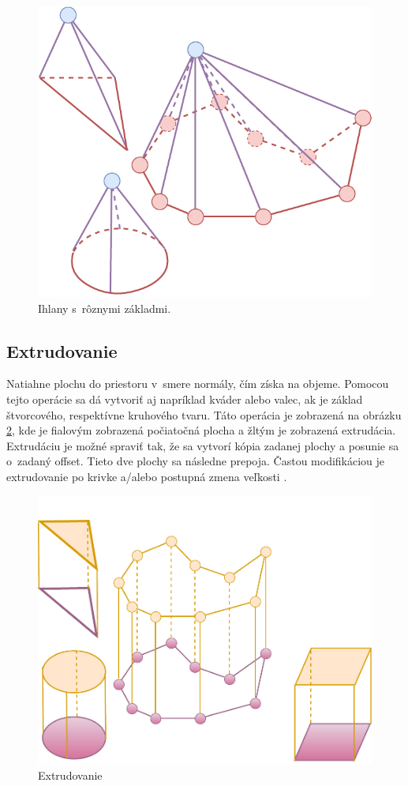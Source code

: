 



\begin{figure}[H]
	\centering
	\includegraphics[height=0.3\textwidth]{obrazky-figures/Diagram/Draw/4Object/DP Navrh operacii-3D - ObjectsCreate Pyramid.pdf}
	\caption{Ihlany s~rôznymi základmi.}
	\label{fig:ObjectsCreate Pyramid}
\end{figure}


\subsection*{Extrudovanie} 
Natiahne plochu do priestoru v~smere normály, čím získa na objeme. Pomocou tejto operácie sa dá vytvoriť aj napríklad kváder alebo valec, ak je základ štvorcového, respektívne kruhového tvaru. Táto operácia je zobrazená na obrázku \ref{fig:ObjectsExtrude}, kde je fialovým zobrazená počiatočná plocha a žltým je zobrazená extrudácia. Extrudáciu je možné spraviť tak, že sa vytvorí kópia zadanej plochy a posunie sa o~zadaný offset. Tieto dve plochy sa následne prepoja. Častou modifikáciou je extrudovanie po krivke a/alebo postupná zmena veľkosti \cite{modernipocitacovagrafika}. 




\begin{figure}[H]
	\centering
	\includegraphics[height=0.3\textwidth]{obrazky-figures/Diagram/Draw/4Object/DP Navrh operacii-3D - ObjectsExtrude.pdf}
	\caption{Extrudovanie}
	\label{fig:ObjectsExtrude}
\end{figure}



